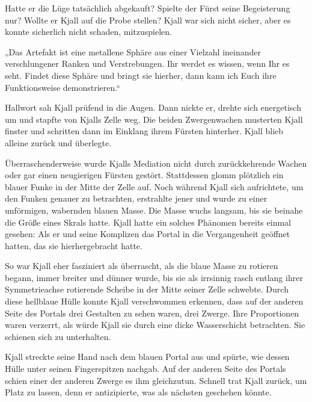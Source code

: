 Hatte er die Lüge tatsächlich abgekauft? Spielte der Fürst seine Begeisterung nur? Wollte er Kjall auf die Probe stellen? Kjall war sich nicht sicher, aber es konnte sicherlich nicht schaden, mitzuspielen.

„Das Artefakt ist eine metallene Sphäre aus einer Vielzahl ineinander verschlungener Ranken und Verstrebungen. Ihr werdet es wissen, wenn Ihr es seht. Findet diese Sphäre und bringt sie hierher, dann kann ich Euch ihre Funktionsweise demonstrieren.“

Hallwort sah Kjall prüfend in die Augen. Dann nickte er, drehte sich energetisch um und stapfte von Kjalls Zelle weg. Die beiden Zwergenwachen musterten Kjall finster und schritten dann im Einklang ihrem Fürsten hinterher. Kjall blieb alleine zurück und überlegte.\bigskip



Überraschenderweise wurde Kjalls Mediation nicht durch zurückkehrende Wachen oder gar einen neugierigen Fürsten gestört. Stattdessen glomm plötzlich ein blauer Funke in der Mitte der Zelle auf. Noch während Kjall sich aufrichtete, um den Funken genauer zu betrachten, erstrahlte jener und wurde zu einer unförmigen, wabernden blauen Masse. Die Masse wuchs langsam, bis sie beinahe die Größe eines Skrals hatte. Kjall hatte ein solches Phänomen bereits einmal gesehen: Als er und seine Komplizen das Portal in die Vergangenheit geöffnet hatten, das sie hierhergebracht hatte.

So war Kjall eher fasziniert als überrascht, als die blaue Masse zu rotieren begann, immer breiter und dünner wurde, bis sie als irrsinnig rasch entlang ihrer Symmetrieachse rotierende Scheibe in der Mitte seiner Zelle schwebte. Durch diese hellblaue Hülle konnte Kjall verschwommen erkennen, dass auf der anderen Seite des Portals drei Gestalten zu sehen waren, drei Zwerge. Ihre Proportionen waren verzerrt, als würde Kjall sie durch eine dicke Wasserschicht betrachten. Sie schienen sich zu unterhalten.

Kjall streckte seine Hand nach dem blauen Portal aus und spürte, wie dessen Hülle unter seinen Fingerspitzen nachgab. Auf der anderen Seite des Portals schien einer der anderen Zwerge es ihm gleichzutun. Schnell trat Kjall zurück, um Platz zu lassen, denn er antizipierte, was als nächsten geschehen könnte.


